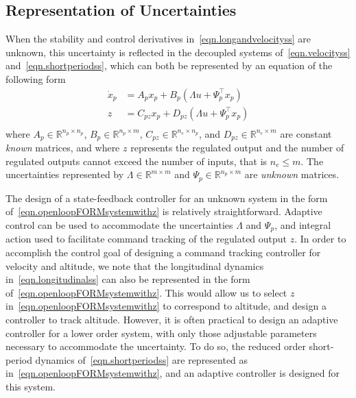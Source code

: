 \documentclass[]{../sty/aiaa-tc}
\theoremstyle{examplestyle}
\begin{document}
  \subsection{Representation of Uncertainties}

  When the stability and control derivatives in\ \eqref{eqn.longandvelocityss} are unknown, this uncertainty is reflected in the decoupled systems of\ \eqref{eqn.velocityss} and\ \eqref{eqn.shortperiodss}, which can both be represented by an equation of the following form
  \begin{equation}
    \label{eqn.openloopFORMsystemwithz}
    \begin{split}
      \dot{x}_{p} &= A_{p}x_{p} + B_{p}(\Lambda u + \Psi_{p}^{\top}x_{p}) \\
      z &= C_{pz}x_{p} + D_{pz}(\Lambda u + \Psi_{p}^{\top}x_{p})\\
    \end{split}
  \end{equation}
  where $A_{p}\in\mathbb{R}^{n_{p}\times n_{p}}$, $B_{p}\in\mathbb{R}^{n_{p}\times m}$, $C_{pz}\in\mathbb{R}^{n_{e}\times n_{p}}$, and $D_{pz}\in\mathbb{R}^{n_{e}\times m}$ are constant \textit{known} matrices, and where $z$ represents the regulated output and the number of regulated outputs cannot exceed the number of inputs, that is $n_{e}\leq m$.
  The uncertainties represented by $\Lambda\in\mathbb{R}^{m\times m}$ and $\Psi_{p}\in\mathbb{R}^{n_{p}\times m}$ are \textit{unknown} matrices.

  The design of a state-feedback controller for an unknown system in the form of\ \eqref{eqn.openloopFORMsystemwithz} is relatively straightforward.
  Adaptive control can be used to accommodate the uncertainties $\Lambda$ and $\Psi_{p}$, and integral action used to facilitate command tracking of the regulated output $z$.
  In order to accomplish the control goal of designing a command tracking controller for velocity and altitude, we note that the longitudinal dynamics in\ \eqref{eqn.longitudinalss} can also be represented in the form of\ \eqref{eqn.openloopFORMsystemwithz}.
  This would allow us to select $z$ in\ \eqref{eqn.openloopFORMsystemwithz} to correspond to altitude, and design a controller to track altitude.
  However, it is often practical to design an adaptive controller for a lower order system, with only those adjustable parameters necessary to accommodate the uncertainty.
  To do so, the reduced order short-period dynamics of\ \eqref{eqn.shortperiodss} are represented as in\ \eqref{eqn.openloopFORMsystemwithz}, and an adaptive controller is designed for this system.
\end{document}

